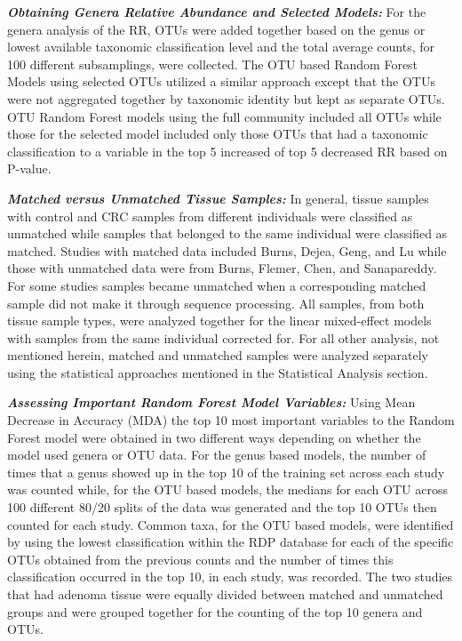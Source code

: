 \documentclass[12pt,]{article}
\begin{document}
\textbf{\emph{Obtaining Genera Relative Abundance and Selected Models:}}
For the genera analysis of the RR, OTUs were added together based on the
genus or lowest available taxonomic classification level and the total
average counts, for 100 different subsamplings, were collected. The OTU
based Random Forest Models using selected OTUs utilized a similar
approach except that the OTUs were not aggregated together by taxonomic
identity but kept as separate OTUs. OTU Random Forest models using the
full community included all OTUs while those for the selected model
included only those OTUs that had a taxonomic classification to a
variable in the top 5 increased of top 5 decreased RR based on P-value.

\textbf{\emph{Matched versus Unmatched Tissue Samples:}} In general,
tissue samples with control and CRC samples from different individuals
were classified as unmatched while samples that belonged to the same
individual were classified as matched. Studies with matched data
included Burns, Dejea, Geng, and Lu while those with unmatched data were
from Burns, Flemer, Chen, and Sanapareddy. For some studies samples
became unmatched when a corresponding matched sample did not make it
through sequence processing. All samples, from both tissue sample types,
were analyzed together for the linear mixed-effect models with samples
from the same individual corrected for. For all other analysis, not
mentioned herein, matched and unmatched samples were analyzed separately
using the statistical approaches mentioned in the Statistical Analysis
section.

\textbf{\emph{Assessing Important Random Forest Model Variables:}} Using
Mean Decrease in Accuracy (MDA) the top 10 most important variables to
the Random Forest model were obtained in two different ways depending on
whether the model used genera or OTU data. For the genus based models,
the number of times that a genus showed up in the top 10 of the training
set across each study was counted while, for the OTU based models, the
medians for each OTU across 100 different 80/20 splits of the data was
generated and the top 10 OTUs then counted for each study. Common taxa,
for the OTU based models, were identified by using the lowest
classification within the RDP database for each of the specific OTUs
obtained from the previous counts and the number of times this
classification occurred in the top 10, in each study, was recorded. The
two studies that had adenoma tissue were equally divided between matched
and unmatched groups and were grouped together for the counting of the
top 10 genera and OTUs.
\end{document}
